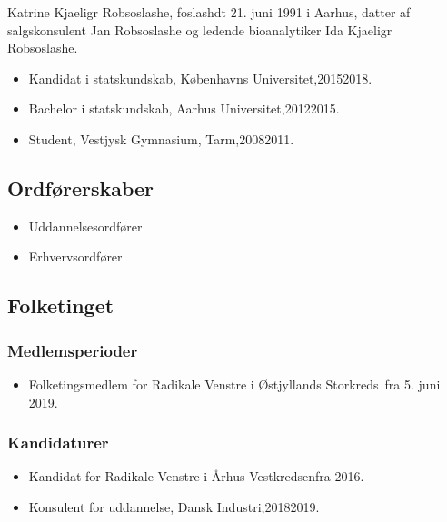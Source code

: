 \documentclass[11pt, a4paper]{awesome-cv}
\begin{document}
\makecvheader[R]
\makelettertitle
\begin{cvletter}
Katrine Kjaeligr Robsoslashe, foslashdt 21. juni 1991 i Aarhus, datter af salgskonsulent Jan Robsoslashe og ledende bioanalytiker Ida Kjaeligr Robsoslashe.

\begin{itemize}
\item Kandidat i statskundskab, Københavns Universitet,20152018.
\item Bachelor i statskundskab, Aarhus Universitet,20122015.
\item Student, Vestjysk Gymnasium, Tarm,20082011.
\end{itemize}
\subsection*{Ordførerskaber}
\begin{itemize}
\item Uddannelsesordfører
\item Erhvervsordfører
\end{itemize}
\subsection*{Folketinget}
\subsubsection*{Medlemsperioder}
\begin{itemize}
\item Folketingsmedlem for Radikale Venstre i Østjyllands Storkreds fra 5. juni 2019.
\end{itemize}
\subsubsection*{Kandidaturer}
\begin{itemize}
\item Kandidat for Radikale Venstre i Århus Vestkredsenfra 2016.
\end{itemize}
\begin{itemize}
\item Konsulent for uddannelse, Dansk Industri,20182019.
\end{itemize}
\end{cvletter}
\end{document}
